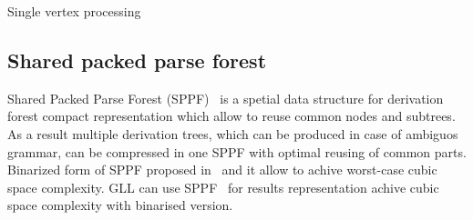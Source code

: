 \begin{algorithm}[h]
\begin{algorithmic}[1]
\caption{Single vertex processing}
\label{processVertex}
  \Else
  \EndIf
\EndFunction

       \Else 
       \EndIf
       \EndIf
  \EndCase
       \EndFor
  \EndCase
  \EndCase
  \Case{$\_$}
  \EndCase
  \EndSwitch
\EndFunction

      \Else
      \EndIf
  \EndWhile
\EndFunction

\end{algorithmic}
\end{algorithm}

\subsection{Shared packed parse forest}

Shared Packed Parse Forest (SPPF)~\cite{SPPF} is a spetial data structure for derivation forest compact representation which allow to reuse common nodes and subtrees.
As a result multiple derivation trees, which can be produced in case of ambiguos grammar, can be compressed in one SPPF with optimal reusing of common parts.  
Binarized form of SPPF proposed in~\cite{brnglr} and it allow to achive worst-case cubic space complexity.
GLL can use SPPF~\cite{gllParsingTree} for results representation achive cubic space complexity with binarised version.

